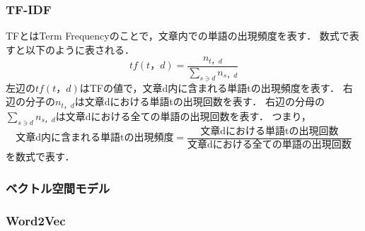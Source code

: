 \subsubsection{TF-IDF}
\label{tech:tfidf}
TFとはTerm Frequencyのことで，文章内での単語の出現頻度を表す．
数式で表すと以下のように表される．
\vspace{3mm}
\[
tf(t，d) = \frac{n_{t，d}}{\sum_{s \ni{d}}n_{s，d}}
\]
\vspace{3mm}
左辺の$ tf(t，d) $はTFの値で，文章d内に含まれる単語tの出現頻度を表す．
右辺の分子の$ n_{t，d} $は文章dにおける単語tの出現回数を表す．
右辺の分母の$ \sum_{s \ni{d}}n_{s，d} $は文章dにおける全ての単語の出現回数を表す．
つまり，
\vspace{3mm}
\[
\mbox{文章d内に含まれる単語tの出現頻度} = \frac{\mbox{文章dにおける単語tの出現回数}}{\mbox{文章dにおける全ての単語の出現回数}}
\]
\vspace{3mm}
を数式で表す．


\subsubsection{ベクトル空間モデル}
\label{tech:voctorkukan}

\subsubsection{Word2Vec}
\label{tech:Word2vec}



